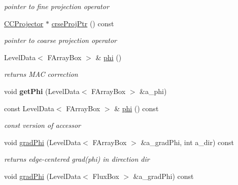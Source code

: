 \begin{DoxyCompactItemize}
\begin{DoxyCompactList}\small\item\em pointer to fine projection operator \end{DoxyCompactList}\item 
\hypertarget{class_c_c_projector_a5b5a0458c7ccf0b93640cded8e04b817}{\hyperlink{class_c_c_projector}{C\-C\-Projector} $\ast$ \hyperlink{class_c_c_projector_a5b5a0458c7ccf0b93640cded8e04b817}{crse\-Proj\-Ptr} () const }\label{class_c_c_projector_a5b5a0458c7ccf0b93640cded8e04b817}

\begin{DoxyCompactList}\small\item\em pointer to coarse projection operator \end{DoxyCompactList}\item 
\hypertarget{class_c_c_projector_ab427dcfce904936e3ae28396f1eacc10}{Level\-Data$<$ F\-Array\-Box $>$ \& \hyperlink{class_c_c_projector_ab427dcfce904936e3ae28396f1eacc10}{phi} ()}\label{class_c_c_projector_ab427dcfce904936e3ae28396f1eacc10}

\begin{DoxyCompactList}\small\item\em returns M\-A\-C correction \end{DoxyCompactList}\item 
\hypertarget{class_c_c_projector_a7b3627d76111f4ea9d4d6f575ef4b722}{void {\bfseries get\-Phi} (Level\-Data$<$ F\-Array\-Box $>$ \&a\-\_\-phi)}\label{class_c_c_projector_a7b3627d76111f4ea9d4d6f575ef4b722}

\item 
\hypertarget{class_c_c_projector_a9adbaa5d24ecf558eaee82147795f921}{const Level\-Data$<$ F\-Array\-Box $>$ \& \hyperlink{class_c_c_projector_a9adbaa5d24ecf558eaee82147795f921}{phi} () const }\label{class_c_c_projector_a9adbaa5d24ecf558eaee82147795f921}

\begin{DoxyCompactList}\small\item\em const version of accessor \end{DoxyCompactList}\item 
\hypertarget{class_c_c_projector_a78b5d331b25101752255a719c9ab6f06}{void \hyperlink{class_c_c_projector_a78b5d331b25101752255a719c9ab6f06}{grad\-Phi} (Level\-Data$<$ F\-Array\-Box $>$ \&a\-\_\-grad\-Phi, int a\-\_\-dir) const }\label{class_c_c_projector_a78b5d331b25101752255a719c9ab6f06}

\begin{DoxyCompactList}\small\item\em returns edge-\/centered grad(phi) in direction dir \end{DoxyCompactList}\item 
\hypertarget{class_c_c_projector_a3f453b4035eac4713caa1640f3f88bf8}{void \hyperlink{class_c_c_projector_a3f453b4035eac4713caa1640f3f88bf8}{grad\-Phi} (Level\-Data$<$ Flux\-Box $>$ \&a\-\_\-grad\-Phi) const }\label{class_c_c_projector_a3f453b4035eac4713caa1640f3f88bf8}


\end{DoxyCompactItemize}

